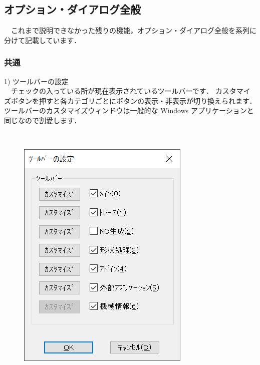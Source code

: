 
\subsection{オプション・ダイアログ全般}
　これまで説明できなかった残りの機能，オプション・ダイアログ全般を系列に分けて記載しています．

\subsubsection{共通}

\begin{minipage}[t]{0.58\textwidth}
1) ツールバーの設定\\
　チェックの入っている所が現在表示されているツールバーです．
カスタマイズボタンを押すと各カテゴリごとにボタンの表示・非表示が切り換えられます．
ツールバーのカスタマイズウィンドウは一般的な Windows アプリケーションと同じなので割愛します．
\end{minipage}
\begin{minipage}[t]{0.02\textwidth}
　
\end{minipage}
\begin{minipage}[t]{0.4\textwidth}
\vspace*{-2zh}
\begin{figure}[H]
\centering
\includegraphics[width=\textwidth]{No6/fig/toolbar.png}
\label{fig:toolbar.png}
\end{figure}
\end{minipage}


